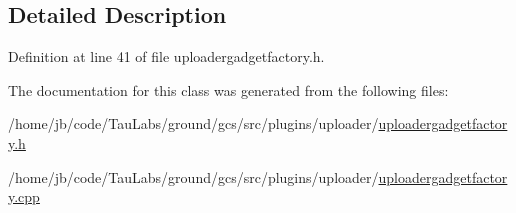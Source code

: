 \subsection{\-Detailed \-Description}


\-Definition at line 41 of file uploadergadgetfactory.\-h.



\-The documentation for this class was generated from the following files\-:\begin{DoxyCompactItemize}
\item 
/home/jb/code/\-Tau\-Labs/ground/gcs/src/plugins/uploader/\hyperlink{uploadergadgetfactory_8h}{uploadergadgetfactory.\-h}\item 
/home/jb/code/\-Tau\-Labs/ground/gcs/src/plugins/uploader/\hyperlink{uploadergadgetfactory_8cpp}{uploadergadgetfactory.\-cpp}\end{DoxyCompactItemize}
